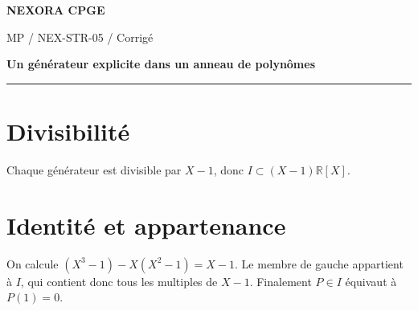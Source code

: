\documentclass[11pt,a4paper]{article}
\begin{document}
{\small\bfseries\color{nexorablue} NEXORA CPGE}\par
{\small MP / NEX-STR-05 / Corrigé}\par
{\LARGE\bfseries Un générateur explicite dans un anneau de polynômes}\par
\vspace{0.25em}\hrule\vspace{0.6em}

\section*{Divisibilité}
Chaque générateur est divisible par $X-1$, donc $I\subset(X-1)\mathbb R[X]$.

\section*{Identité et appartenance}
On calcule $(X^3-1)-X(X^2-1)=X-1$. Le membre de gauche appartient à $I$, qui contient donc tous les multiples de $X-1$. Finalement $P\in I$ équivaut à $P(1)=0$.
\end{document}
